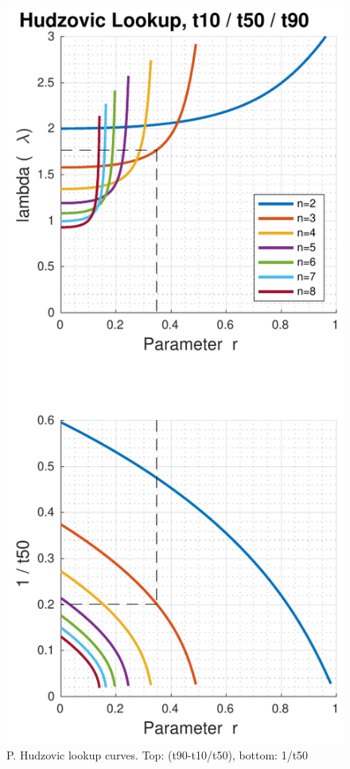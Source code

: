 \begin{figure}[t]
    \includegraphics[width=\linewidth]{images/hudzovic_curves_t10_t50_t90}
    \caption{P. Hudzovic lookup curves. Top: (t90-t10/t50), bottom: 1/t50}
    \label{fig:hudzovic_t3}
\end{figure}

